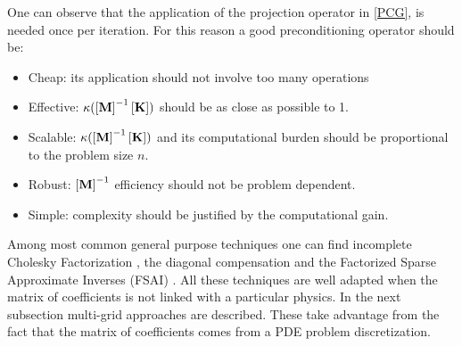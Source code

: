 One can observe that the application of the projection operator in \ref{PCG}, is needed once per iteration. For this reason a good preconditioning operator should be:
\begin{itemize}
\item Cheap: its application should not involve too many operations
\item Effective: $\kappa(\left[{\mathbf{M}}\right]^{-1}\left[{\mathbf{K}}\right])$ should be as close as possible to 1.
\item Scalable:  $\kappa(\left[{\mathbf{M}}\right]^{-1}\left[{\mathbf{K}}\right])$ and its computational burden should be proportional to the problem size $n$.
\item Robust:  $\left[{\mathbf{M}}\right]^{-1}$ efficiency should not be problem dependent.
\item Simple:  complexity should be justified by the computational gain.
\end{itemize}
Among most common general purpose techniques one can find incomplete Cholesky Factorization \cite{kershaw1978incomplete}, the diagonal compensation \cite{jacobi1845ueber} and the Factorized Sparse Approximate Inverses (FSAI) \cite{buleev1960numerical,buleev1960numerical2,meijerink1977iterative,il1992iterative,varga1960boundary}. All these techniques are well adapted when the matrix of coefficients is not linked with a particular physics. In the next subsection multi-grid approaches are described. These take advantage from the fact that the matrix of coefficients comes from a PDE problem discretization.
